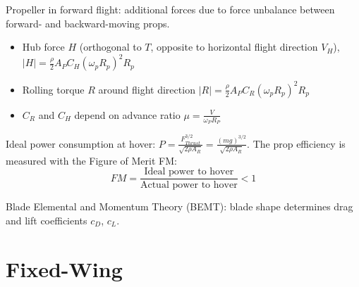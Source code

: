 \documentclass[a4paper, 8pt]{extarticle}
\begin{document}
\begin{multicols*}{3}
Propeller in forward flight: additional forces due to force unbalance between forward- and backward-moving props.
\begin{itemize}
\item Hub force $H$ (orthogonal to $T$, opposite to horizontal flight direction $V_H$), $|H| = \frac{\rho}{2} A_P C_H(\omega_p R_p)^2R_p$
\item Rolling torque $R$ around flight direction $|R| = \frac{\rho}{2} A_P C_R(\omega_p R_p)^2R_p$
\item $C_R$ and $C_H$ depend on advance ratio $\mu = \frac{V}{\omega_P R_P}$
\end{itemize}

Ideal power consumption at hover: $P = \frac{F_{Thrust}^{3/2}}{\sqrt{2\rho A_R}} = \frac{(mg)^{3/2}}{\sqrt{2\rho A_R}}$. The prop efficiency is measured with the Figure of Merit FM:
$$FM = \frac{\text{Ideal power to hover}}{\text{Actual power to hover}} < 1$$

Blade Elemental and Momentum Theory (BEMT): blade shape determines drag and lift coefficients $c_D$, $c_L$.




\section{Fixed-Wing}

\end{multicols*}
\end{document}
